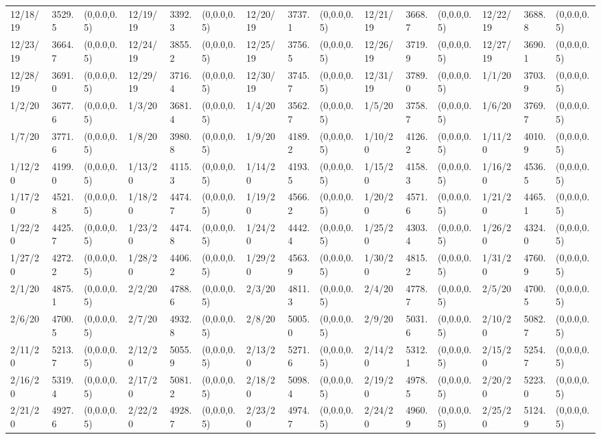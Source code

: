 \documentclass[12pt]{article}
\begin{document}
\begin{table}
\begin{center}
\begin{tabular}{p{15pt}p{15pt}p{25pt}p{15pt}p{15pt}p{25pt}p{15pt}p{15pt}p{25pt}p{15pt}p{15pt}p{25pt}p{15pt}p{15pt}p{25pt}}
            12/18/19&3529.5&(0,0.0,0.5)&12/19/19&3392.3&(0,0.0,0.5)&12/20/19&3737.1&(0,0.0,0.5)&12/21/19&3668.7&(0,0.0,0.5)&12/22/19&3688.8&(0,0.0,0.5)\\
            12/23/19&3664.7&(0,0.0,0.5)&12/24/19&3855.2&(0,0.0,0.5)&12/25/19&3756.5&(0,0.0,0.5)&12/26/19&3719.9&(0,0.0,0.5)&12/27/19&3690.1&(0,0.0,0.5)\\
            12/28/19&3691.0&(0,0.0,0.5)&12/29/19&3716.4&(0,0.0,0.5)&12/30/19&3745.7&(0,0.0,0.5)&12/31/19&3789.0&(0,0.0,0.5)&1/1/20&3703.9&(0,0.0,0.5)\\
            1/2/20&3677.6&(0,0.0,0.5)&1/3/20&3681.4&(0,0.0,0.5)&1/4/20&3562.7&(0,0.0,0.5)&1/5/20&3758.7&(0,0.0,0.5)&1/6/20&3769.7&(0,0.0,0.5)\\
            1/7/20&3771.6&(0,0.0,0.5)&1/8/20&3980.8&(0,0.0,0.5)&1/9/20&4189.2&(0,0.0,0.5)&1/10/20&4126.2&(0,0.0,0.5)&1/11/20&4010.9&(0,0.0,0.5)\\
            1/12/20&4199.0&(0,0.0,0.5)&1/13/20&4115.3&(0,0.0,0.5)&1/14/20&4193.5&(0,0.0,0.5)&1/15/20&4158.3&(0,0.0,0.5)&1/16/20&4536.5&(0,0.0,0.5)\\
            1/17/20&4521.8&(0,0.0,0.5)&1/18/20&4474.7&(0,0.0,0.5)&1/19/20&4566.2&(0,0.0,0.5)&1/20/20&4571.6&(0,0.0,0.5)&1/21/20&4465.1&(0,0.0,0.5)\\
            1/22/20&4425.7&(0,0.0,0.5)&1/23/20&4474.8&(0,0.0,0.5)&1/24/20&4442.4&(0,0.0,0.5)&1/25/20&4303.4&(0,0.0,0.5)&1/26/20&4324.0&(0,0.0,0.5)\\
            1/27/20&4272.2&(0,0.0,0.5)&1/28/20&4406.2&(0,0.0,0.5)&1/29/20&4563.9&(0,0.0,0.5)&1/30/20&4815.2&(0,0.0,0.5)&1/31/20&4760.9&(0,0.0,0.5)\\
            2/1/20&4875.1&(0,0.0,0.5)&2/2/20&4788.6&(0,0.0,0.5)&2/3/20&4811.3&(0,0.0,0.5)&2/4/20&4778.7&(0,0.0,0.5)&2/5/20&4700.5&(0,0.0,0.5)\\
            2/6/20&4700.5&(0,0.0,0.5)&2/7/20&4932.8&(0,0.0,0.5)&2/8/20&5005.0&(0,0.0,0.5)&2/9/20&5031.6&(0,0.0,0.5)&2/10/20&5082.7&(0,0.0,0.5)\\
            2/11/20&5213.7&(0,0.0,0.5)&2/12/20&5055.9&(0,0.0,0.5)&2/13/20&5271.6&(0,0.0,0.5)&2/14/20&5312.1&(0,0.0,0.5)&2/15/20&5254.7&(0,0.0,0.5)\\
            2/16/20&5319.4&(0,0.0,0.5)&2/17/20&5081.2&(0,0.0,0.5)&2/18/20&5098.4&(0,0.0,0.5)&2/19/20&4978.5&(0,0.0,0.5)&2/20/20&5223.0&(0,0.0,0.5)\\
            2/21/20&4927.6&(0,0.0,0.5)&2/22/20&4928.7&(0,0.0,0.5)&2/23/20&4974.7&(0,0.0,0.5)&2/24/20&4960.9&(0,0.0,0.5)&2/25/20&5124.9&(0,0.0,0.5)\\

\end{tabular}
\end{center}
\end{table}
\end{document}

